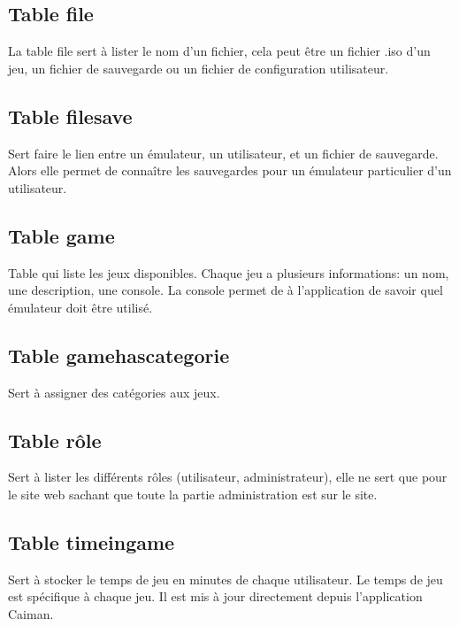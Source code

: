 \documentclass[a4paper,12pt,french]{sphinxmanual}
\begin{document}
\subsection{Table file}
\label{\detokenize{fonctionnelle:table-file}}
\sphinxAtStartPar
La table file sert à lister le nom d’un fichier, cela peut être un fichier .iso d’un jeu, un fichier de sauvegarde ou un fichier de configuration utilisateur.


\subsection{Table filesave}
\label{\detokenize{fonctionnelle:table-filesave}}
\sphinxAtStartPar
Sert  faire le lien entre un émulateur, un utilisateur, et un fichier de sauvegarde. Alors elle permet de connaître les sauvegardes pour un émulateur particulier d’un utilisateur.


\subsection{Table game}
\label{\detokenize{fonctionnelle:table-game}}
\sphinxAtStartPar
Table qui liste les jeux disponibles. Chaque jeu a plusieurs informations: un nom, une description, une console. La console permet de à l’application de savoir quel émulateur doit être utilisé.


\subsection{Table gamehascategorie}
\label{\detokenize{fonctionnelle:table-gamehascategorie}}
\sphinxAtStartPar
Sert à assigner des catégories aux jeux.


\subsection{Table rôle}
\label{\detokenize{fonctionnelle:table-role}}
\sphinxAtStartPar
Sert à lister les différents rôles (utilisateur, administrateur), elle ne sert que pour le site web sachant que toute la partie administration est sur le site.


\subsection{Table timeingame}
\label{\detokenize{fonctionnelle:table-timeingame}}
\sphinxAtStartPar
Sert à stocker le temps de jeu en minutes de chaque utilisateur. Le temps de jeu est spécifique à chaque jeu. Il est mis à jour directement depuis l’application Caiman.
\end{document}
